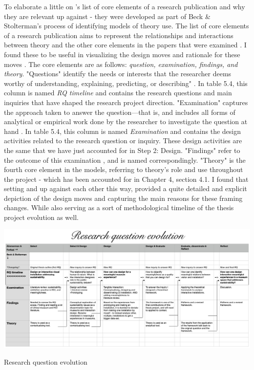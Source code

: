 To elaborate a little on \autocite{beck_examining_2016}'s list of core elements of a research publication and why they are relevant up against \autocite{zimmerman_research_2014} - they were developed as part of Beck \& Stolterman's process of identifying models of theory use. The list of core elements of a research publication aims to represent the relationships and interactions between theory and the other core elements in the papers that were examined \autocite[p. 129]{beck_examining_2016}. I found these to be useful in visualizing the design moves and rationale for these moves \autocite{zimmerman_research_2014}. The core elements are as follows: \textit{question, examination, findings, and theory}. "Questions" identify the needs or interests that the researcher deems worthy of understanding, explaining, predicting, or describing" \autocite[p. 129]{beck_examining_2016}. In table 5.4, this column is named \textit{RQ timeline} and contains the research questions and main inquiries that have shaped the research project direction. "Examination" captures the approach taken to answer the question—that is, and includes all forms of analytical or empirical work done by the researcher to investigate the question at hand \autocite[p. 129]{beck_examining_2016}. In table 5.4, this column is named \textit{Examination} and contains the design activities related to the research question or inquiry. These design activities are the same that we have just accounted for in Step 2: Design. "Findings" refer to the outcome of this examination \autocite[p. 129]{beck_examining_2016}, and is named correspondingly. "Theory" is the fourth core element in the models, referring to theory's role and use throughout the project - which has been accounted for in Chapter 4, section 4.1. I found that setting \autocite{zimmerman_research_2014} and \autocite{beck_examining_2016} up against each other this way, provided a quite detailed and explicit depiction of the design moves and capturing the main reasons for these framing changes. While also serving as a sort of methodological timeline of the thesis project evolution as well.

\begin{table}[H]
\includegraphics[width=22cm, angle=90]{pictures/methodology/rq_evolution.png}
\caption{Research question evolution}
\centering
\end{table}

